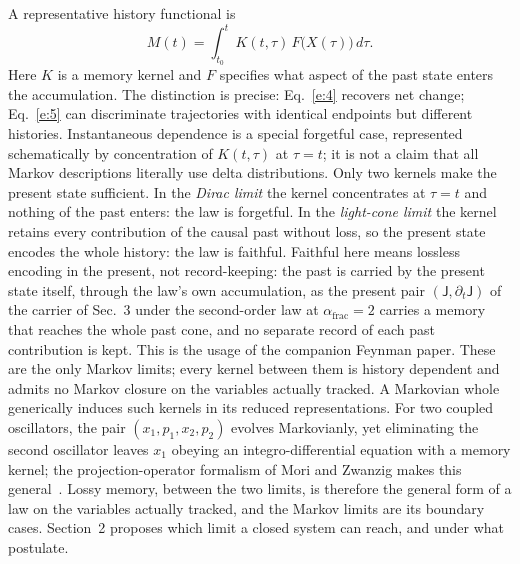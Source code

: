 \documentclass[10pt]{article}
\newcommand{\sJ}{\mathsf{J}}
\newcommand{\afrac}{\alpha_{\mathrm{frac}}}
\begin{document}
A representative history functional is
\begin{equation}
M(t)=\int_{t_0}^{t}K(t,\tau)\,F\bigl(X(\tau)\bigr)\,d\tau.\label{e:5}
\end{equation}
Here $K$ is a memory kernel and $F$ specifies what aspect of the past state enters the accumulation. The distinction is precise: Eq.~\eqref{e:4} recovers net change; Eq.~\eqref{e:5} can discriminate trajectories with identical endpoints but different histories. Instantaneous dependence is a special forgetful case, represented schematically by concentration of $K(t,\tau)$ at $\tau=t$; it is not a claim that all Markov descriptions literally use delta distributions. Only two kernels make the present state sufficient. In the \emph{Dirac limit} the kernel concentrates at $\tau=t$ and nothing of the past enters: the law is forgetful. In the \emph{light-cone limit} the kernel retains every contribution of the causal past without loss, so the present state encodes the whole history: the law is faithful. Faithful here means lossless encoding in the present, not record-keeping: the past is carried by the present state itself, through the law's own accumulation, as the present pair $(\sJ,\partial_t\sJ)$ of the carrier of Sec.~3 under the second-order law at $\afrac=2$ carries a memory that reaches the whole past cone, and no separate record of each past contribution is kept. This is the usage of the companion Feynman paper. These are the only Markov limits; every kernel between them is history dependent and admits no Markov closure on the variables actually tracked. A Markovian whole generically induces such kernels in its reduced representations. For two coupled oscillators, the pair $(x_1,p_1,x_2,p_2)$ evolves Markovianly, yet eliminating the second oscillator leaves $x_1$ obeying an integro-differential equation with a memory kernel; the projection-operator formalism of Mori and Zwanzig makes this general~\cite{mori,zwanzig}. Lossy memory, between the two limits, is therefore the general form of a law on the variables actually tracked, and the Markov limits are its boundary cases. Section~2 proposes which limit a closed system can reach, and under what postulate.
\end{document}
